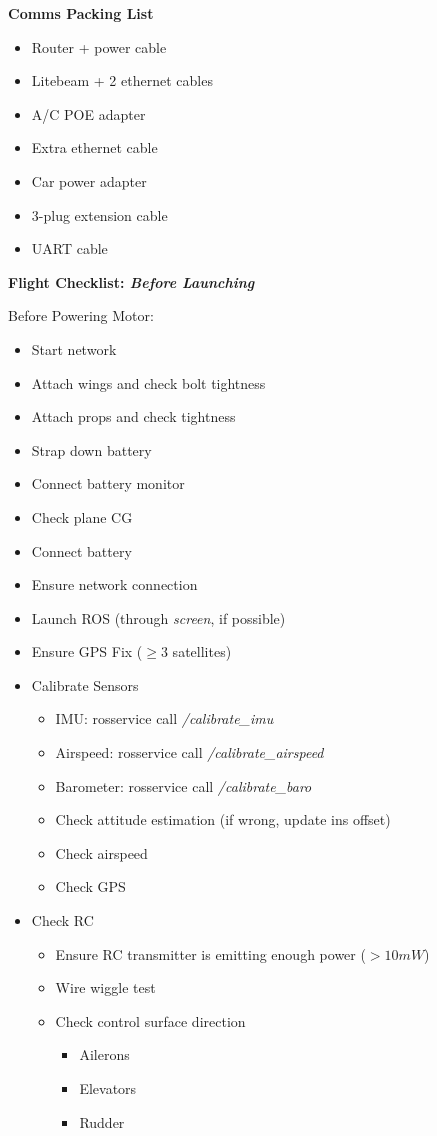 \documentclass[]{auvsi_doc}
\begin{document}
\hrulefill

\textbf{Comms Packing List}
\begin{itemize}
	\item Router + power cable
	\item Litebeam + 2 ethernet cables
	\item A/C POE adapter
	\item Extra ethernet cable
	\item Car power adapter
	\item 3-plug extension cable
	\item UART cable
\end{itemize}

\hrulefill

\textbf{Flight Checklist: \textit{Before Launching}}

Before Powering Motor:

\begin{itemize}
	\item Start network
	\item Attach wings and check bolt tightness
	\item Attach props and check tightness
	\item Strap down battery
	\item Connect battery monitor
	\item Check plane CG
	\item Connect battery
	\item Ensure network connection
	\item Launch ROS (through \textit{screen}, if possible)
	\item Ensure GPS Fix ($\geq 3$ satellites)
	\item Calibrate Sensors
	\begin{itemize}
		\item IMU: rosservice call \textit{/calibrate\_imu}
		\item Airspeed: rosservice call \textit{/calibrate\_airspeed}
		\item Barometer: rosservice call \textit{/calibrate\_baro}
		\item Check attitude estimation (if wrong, update ins offset)
		\item Check airspeed
		\item Check GPS
	\end{itemize}
	\item Check RC
	\begin{itemize}
		\item Ensure RC transmitter is emitting enough power ($>10mW$)
		\item Wire wiggle test
		\item Check control surface direction
		\begin{itemize}
			\item Ailerons
			\item Elevators
			\item Rudder
		\end{itemize}
	\end{itemize}	
\end{itemize}
\end{document}
